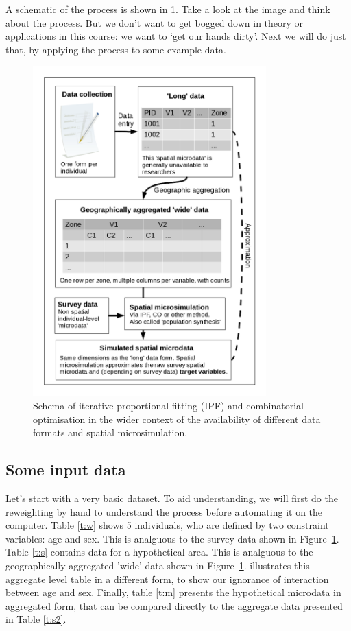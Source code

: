 \documentclass[a4paper, 11pt, twoside]{article}
\begin{document}
A schematic of the process is shown in \cref{fmsim-schema}.
Take a look at the image and think about the process. But we don't want to get
bogged down in theory or applications in this course: we want to `get our
hands dirty'. Next we will do just that, by applying the process to some
example data.

\begin{figure}[H]
\begin{center}
  \includegraphics[width=9cm]{msim-schema}
\end{center}
\caption{Schema of iterative proportional fitting (IPF) and combinatorial
optimisation
in the wider context of the availability of different data formats and spatial
microsimulation. \label{fmsim-schema}}
\end{figure}


\subsection{Some input data} \label{s:theory}

Let's start with a very basic dataset. To aid understanding, we will first do
the reweighting by hand
to understand the process before automating it on the computer.
Table \ref{t:w} shows 5 individuals, who are defined by two
constraint variables: age and sex. This is analguous to the survey data shown in Figure~\ref{fmsim-schema}.
Table \ref{t:s} contains data for a hypothetical area. This is analguous to the geographically aggregated 'wide' data shown in Figure~\ref{fmsim-schema}.  illustrates
this aggregate level table in a different form,
to show our ignorance of interaction between age and sex. Finally, table
\ref{t:m} presents the hypothetical microdata in aggregated form,
that can be compared directly to the aggregate data presented in
Table \ref{t:s2}.
\end{document}

